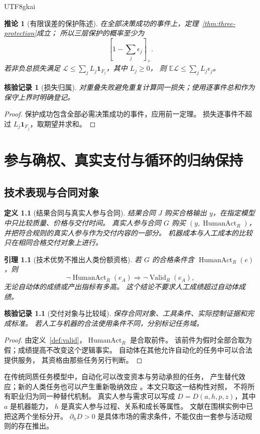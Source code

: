 \documentclass[12pt,a4paper,openany]{report}
\newtheorem{definition}{定义}[chapter]
\newtheorem{lemma}{引理}[chapter]
\newtheorem{corollary}{推论}[chapter]
\newtheorem{Certificate}{核验记录}[chapter]
\newcommand{\EE}{\mathbb E}
\newcommand{\Ind}{\mathbf 1}
\newcommand{\Valid}{\operatorname{Valid}}
\newcommand{\Human}{\operatorname{HumanAct}}
\begin{document}
\begin{CJK*}{UTF8}{gkai}
\begin{corollary}[有限误差的保护陈述]
在全部决策成功的事件上，定理~\ref{thm:three-protection}成立；
所以三层保护的概率至少为
\[
\left[1-\sum_j\epsilon_j\right]_+.
\]
若非负总损失满足
\(\mathcal L\le\sum_jL_j\Ind_{F_j}\)，其中 \(L_j\ge0\)，
则 \(\EE\mathcal L\le\sum_j L_j\epsilon_j\)。
\end{corollary}
\begin{Certificate}[损失归属]
对重叠失败避免重复计算同一损失；使用逐事件总和作为保守上界时明确登记。
\end{Certificate}
\begin{proof}
保护成功包含全部必需决策成功的事件，应用前一定理。
损失逐事件不超过 \(L_j\Ind_{F_j}\)，取期望并求和。
\end{proof}

\chapter{参与确权、真实支付与循环的归纳保持}
\label{ch:economy}

\section{技术表现与合同对象}
\begin{definition}[结果合同与真实人参与合同]
结果合同 \(J\) 购买合格输出 \(y\)，在指定模型中只比较质量、价格与交付时间。
真实人参与合同 \(G\) 购买 \((y,\Human_R)\)，
并把符合规则的真实人参与作为交付内容的一部分。
机器成本与人工成本的比较只在相同合格交付对象上进行。
\end{definition}

\begin{lemma}[技术优势不推出人类份额资格]
\label{lem:ability}
若 \(G\) 的合格条件含 \(\Human_R(e)\)，则
\[
\neg\Human_R(e_A)\Longrightarrow\neg\Valid_R(e_A),
\]
无论自动体的成绩或产出指标有多高。
这个结论不要求人工成绩超过自动体成绩。
\end{lemma}
\begin{Certificate}[交付对象与比较域]
保存合同对象、工具条件、实际控制证据和完成标准。
若人工与机器的合法使用条件不同，分别标记任务域。
\end{Certificate}
\begin{proof}
由定义~\ref{def:valid}，\(\Human_R\) 是合取前件。
该前件为假时全部合取为假；成绩提高不改变这个逻辑事实。
自动体在其他允许自动化的任务中可以合法提供服务，
其资格由那些任务另行判断。
\end{proof}

在传统同质任务模型中，自动化可以改变资本与劳动承担的任务，
产生替代效应；新的人类任务也可以产生重新吸纳效应
\cite{AcemogluRestrepo}。本文只取这一结构性对照，
不将所有职业归为同一种替代机制。
真实人参与需求可以写成 \(D=D(a,h,p,z)\)，其中 \(a\) 是机器能力，
\(h\) 是真实人参与过程、关系和成长等属性。
文献\cite{EMarket}在围棋实例中已把这两个坐标分开。
\(\partial_hD>0\) 是具体市场的需求条件，不能仅由一套参与活动规则的存在推出。


\end{CJK*}
\end{document}
